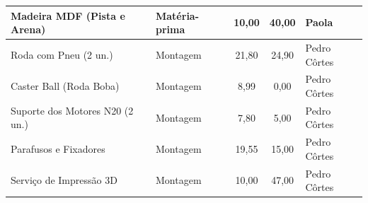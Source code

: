 \begin{landscape}
\begin{table}[H]
\begin{tabularx}{\linewidth}{|X|l|c|c|l|}
Madeira MDF (Pista e Arena) & Matéria-prima & 10,00 & 40,00 & Paola \\ \hline
Roda com Pneu (2 un.) & Montagem & 21,80 & 24,90 & Pedro Côrtes \\ \hline
Caster Ball (Roda Boba) & Montagem & 8,99 & 0,00 & Pedro Côrtes \\ \hline
Suporte dos Motores N20 (2 un.) & Montagem & 7,80 & 5,00 & Pedro Côrtes \\ \hline
Parafusos e Fixadores & Montagem & 19,55 & 15,00 & Pedro Côrtes \\ \hline
Serviço de Impressão 3D & Montagem & 10,00 & 47,00 & Pedro Côrtes \\ \hline
\end{tabularx}
\end{table}

\end{landscape}
